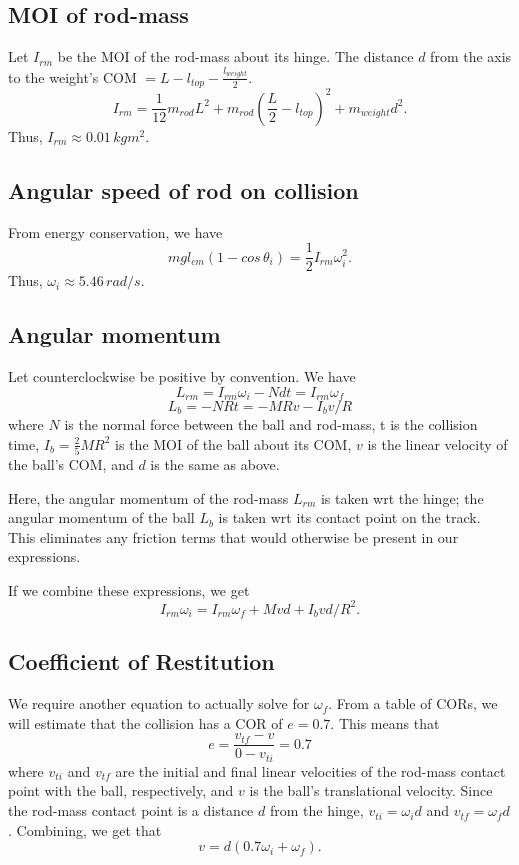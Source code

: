 \documentclass[12pt]{article} %
\begin{document}
\subsection{MOI of rod-mass}

Let $I_{rm}$ be the MOI of the rod-mass about its hinge. The distance $d$ from the axis to the weight's COM $= L - l_{top} - \frac{l_{weight}}{2}$.
$$I_{rm} = \frac{1}{12}m_{rod}L^2 + m_{rod}(\frac{L}{2} - l_{top})^2 + m_{weight}d^2.$$
Thus, $I_{rm} \approx 0.01\, kgm^2$.

\subsection{Angular speed of rod on collision}

From energy conservation, we have
$$mgl_{cm}(1-cos\,\theta_i) = \frac{1}{2}I_{rm}\omega_i^2.$$
Thus, $\omega_i \approx 5.46\, rad/s$.

\subsection{Angular momentum}

Let counterclockwise be positive by convention. We have
$$L_{rm} = I_{rm}\omega_i - Ndt = I_{rm}\omega_f$$
$$L_b = -NRt = -MRv - I_b v/R$$
where $N$ is the normal force between the ball and rod-mass, t is the collision time, $I_b = \frac{2}{5}MR^2$ is the MOI of the ball about its COM, $v$ is the linear velocity of the ball's COM, and $d$ is the same as above.

Here, the angular momentum of the rod-mass $L_{rm}$ is taken wrt the hinge; the angular momentum of the ball $L_b$ is taken wrt its contact point on the track. This eliminates any friction terms that would otherwise be present in our expressions.

If we combine these expressions, we get
$$I_{rm} \omega_i = I_{rm} \omega_f + Mvd + I_b vd/R^2.$$

\subsection{Coefficient of Restitution}

We require another equation to actually solve for $\omega_f$. From a table of CORs, we will estimate that the collision has a COR of $e = 0.7$.
This means that $$e = \frac{v_{tf} - v}{0-v_{ti}} = 0.7$$
where $v_{ti}$ and $v_{tf}$ are the initial and final linear velocities of the rod-mass contact point with the ball, respectively, and $v$ is the ball's translational velocity.
Since the rod-mass contact point is a distance $d$ from the hinge, $v_{ti} = \omega_i d$ and $v_{tf} = \omega_f d$.
Combining, we get that $$v = d(0.7\omega_i + \omega_f).$$
\end{document}
